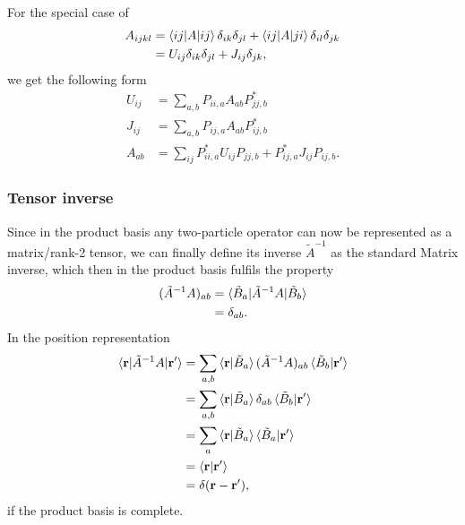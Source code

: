 \documentclass[12pt,a4paper]{scrartcl}
\numberwithin{equation}{section}
\renewcommand{\vec}{\mathbf}
\begin{document}
For the special case of 
\begin{align}
A_{ijkl} &= \braket{ij|A|ij}\delta_{ik}\delta_{jl} + \braket{ij|A|ji}\delta_{il}\delta_{jk} \\
&= U_{ij} \delta_{ik}\delta_{jl} + J_{ij}\delta_{jk},
\end{align}
we get the following form
\begin{align}
U_{ij} &= \sum_{a,b} P_{ii,a} A_{ab} P^*_{jj,b} \\
J_{ij} &= \sum_{a,b} P_{ij,a} A_{ab} P^*_{ij,b} \\
A_{ab} &= \sum_{ij} P^*_{ii,a}  U_{ij} P_{jj,b} + P^*_{ij,a}  J_{ij} P_{ij,b}.
\end{align}

% 
% 

\subsubsection{Tensor inverse}

Since in the product basis any two-particle operator can now be
represented as a matrix/rank-2 tensor, we can finally define its inverse $\tilde{A}^{-1}$ as the standard Matrix inverse, which then in the product basis fulfils the property
\begin{align}
 (\tilde{A}^{-1}A)_{ab}
&= \braket{ \tilde{B}_a | \tilde{A}^{-1}A | \tilde{B}_b } \\
&= \delta_{ab}.
\end{align}
In the position representation
\begin{align}
\braket{\vec{r} | \tilde{A}^{-1}A | \vec{r}' }
 &= \sum_{a,b} \braket{\vec{r}|\tilde{B}_a} (\tilde{A}^{-1}A)_{ab}\braket{\tilde{B}_b|\vec{r}'} \\
%
&= \sum_{a,b} \braket{\vec{r}|\tilde{B}_a} \delta_{ab} \braket{\tilde{B}_b|\vec{r}'} \\
&= \sum_{a} \braket{\vec{r}|\tilde{B}_a} \braket{\tilde{B}_a|\vec{r}'} \\
&= \braket{\vec{r}|\vec{r}'} \\
&= \delta(\vec{r}-\vec{r}'),
\end{align}
if the product basis is complete.
\end{document}
